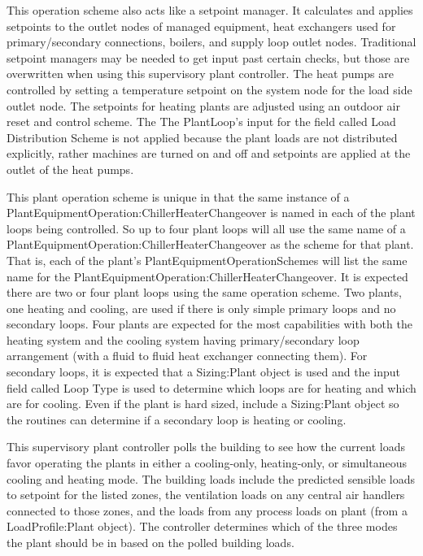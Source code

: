 This operation scheme also acts like a setpoint manager.  It calculates and applies setpoints to the outlet nodes of managed equipment, heat exchangers used for primary/secondary connections, boilers, and supply loop outlet nodes.  Traditional setpoint managers may be needed to get input past certain checks, but those are overwritten when using this supervisory plant controller.  The heat pumps are controlled by setting a temperature setpoint on the system node for the load side outlet node.  The setpoints for heating plants are adjusted using an outdoor air reset and control scheme.  The The PlantLoop's input for the field called Load Distribution Scheme is not applied because the plant loads are not distributed explicitly, rather machines are turned on and off and setpoints are applied at the outlet of the heat pumps. 

This plant operation scheme is unique in that the same instance of a PlantEquipmentOperation:ChillerHeaterChangeover is named in each of the plant loops being controlled.  So up to four plant loops will all use the same name of a PlantEquipmentOperation:ChillerHeaterChangeover as the scheme for that plant.  That is, each of the plant's PlantEquipmentOperationSchemes will list the same name for the PlantEquipmentOperation:ChillerHeaterChangeover.  It is expected there are two or four plant loops using the same operation scheme.  Two plants, one heating and cooling, are used if there is only simple primary loops and no secondary loops.  Four plants are expected for the most capabilities with both the heating system and the cooling system having primary/secondary loop arrangement (with a fluid to fluid heat exchanger connecting them).  For secondary loops, it is expected that a Sizing:Plant object is used and the input field called Loop Type is used to determine which loops are for heating and which are for cooling.  Even if the plant is hard sized, include a Sizing:Plant object so the routines can determine if a secondary loop is heating or cooling.  

This supervisory plant controller polls the building to see how the current loads favor operating the plants in either a cooling-only, heating-only, or simultaneous cooling and heating mode.  The building loads include the predicted sensible loads to setpoint for the listed zones, the ventilation loads on any central air handlers connected to those zones, and the loads from any process loads on plant (from a LoadProfile:Plant object).  The controller determines which of the three modes the plant should be in based on the polled building loads. 

